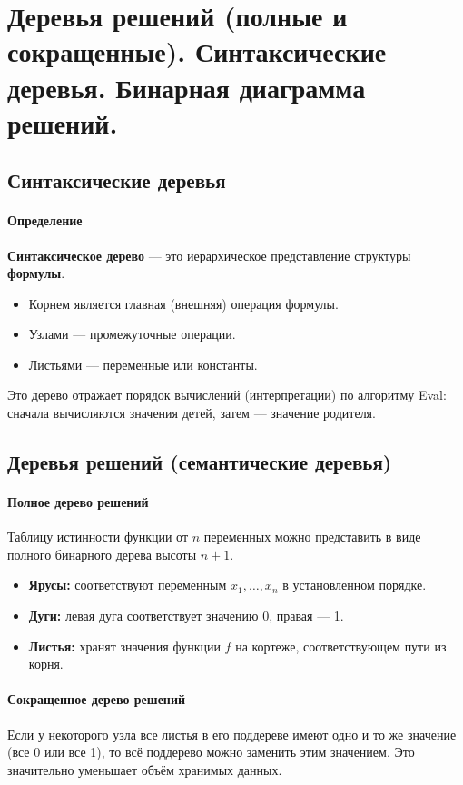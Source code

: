 \section{Деревья решений (полные и сокращенные). Синтаксические деревья. Бинарная диаграмма решений.}

\subsection*{Синтаксические деревья}

\paragraph{Определение}
\textbf{Синтаксическое дерево} — это иерархическое представление структуры \textbf{формулы}. 
\begin{itemize}
    \item Корнем является главная (внешняя) операция формулы.
    \item Узлами — промежуточные операции.
    \item Листьями — переменные или константы.
\end{itemize}
Это дерево отражает порядок вычислений (интерпретации) по алгоритму Eval: сначала вычисляются значения детей, затем — значение родителя.

\subsection*{Деревья решений (семантические деревья)}

\paragraph{Полное дерево решений}
Таблицу истинности функции от $n$ переменных можно представить в виде полного бинарного дерева высоты $n+1$.
\begin{itemize}
    \item \textbf{Ярусы:} соответствуют переменным $x_1, \dots, x_n$ в установленном порядке.
    \item \textbf{Дуги:} левая дуга соответствует значению 0, правая — 1.
    \item \textbf{Листья:} хранят значения функции $f$ на кортеже, соответствующем пути из корня.
\end{itemize}

\paragraph{Сокращенное дерево решений}
Если у некоторого узла все листья в его поддереве имеют одно и то же значение (все 0 или все 1), то всё поддерево можно заменить этим значением. Это значительно уменьшает объём хранимых данных.

